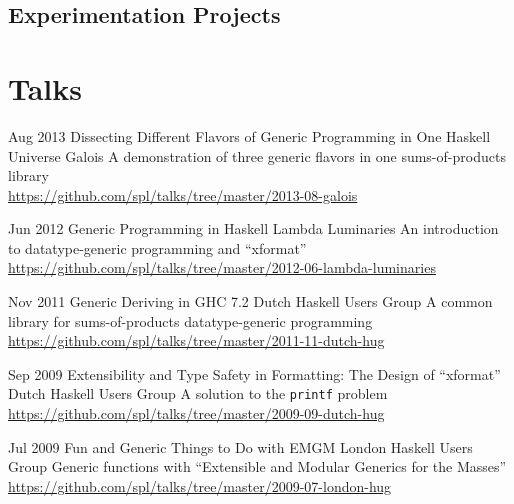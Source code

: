 \documentclass[11pt,a4paper,roman]{moderncv}
\begin{document}
\subsection{Experimentation Projects}




\nocite{*}




\section{Talks}

\talksentry%
{Aug 2013}%
{Dissecting Different Flavors of Generic Programming in One Haskell Universe}%
{Galois}%
{\portland}%
{}%
{A demonstration of three generic flavors in one sums-of-products library
\\
\url{https://github.com/spl/talks/tree/master/2013-08-galois}}

\talksentry%
{Jun 2012}%
{Generic Programming in Haskell}%
{Lambda Luminaries}%
{\centurion}%
{}%
{An introduction to datatype-generic programming and ``xformat''
\\
\url{https://github.com/spl/talks/tree/master/2012-06-lambda-luminaries}}

\talksentry%
{Nov 2011}%
{Generic Deriving in GHC 7.2}%
{Dutch Haskell Users Group}%
{\utrecht}%
{}%
{A common library for sums-of-products datatype-generic programming
\\
\url{https://github.com/spl/talks/tree/master/2011-11-dutch-hug}}

\talksentry%
{Sep 2009}%
{Extensibility and Type Safety in Formatting: The Design of ``xformat''}%
{Dutch Haskell Users Group}%
{\utrecht}%
{}%
{A solution to the \texttt{printf} problem
\\
\url{https://github.com/spl/talks/tree/master/2009-09-dutch-hug}}

\talksentry%
{Jul 2009}%
{Fun and Generic Things to Do with EMGM}%
{London Haskell Users Group}%
{\london}%
{}%
{Generic functions with ``Extensible and Modular Generics for the Masses''
\\
\url{https://github.com/spl/talks/tree/master/2009-07-london-hug}}
\end{document}
